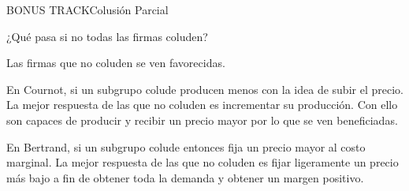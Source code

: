 \documentclass[notes, 11pt]{beamer} %
\newenvironment{wideitemize}{\itemize\addtolength{\itemsep}{10pt}}{\enditemize}
\begin{document}
\begin{frame}{BONUS TRACK}{Colusi\'on Parcial}
\begin{wideitemize}
	\item<1-> ¿Qu\'e pasa si no todas las firmas coluden?
		\begin{wideitemize}
			\item<2->[--] Las firmas que no coluden se ven favorecidas.
			\item<3->[--] En Cournot, si un subgrupo colude producen menos con la idea de subir el precio. La mejor respuesta de las que no coluden es incrementar su producci\'on. Con ello son capaces de producir y recibir un precio mayor por lo que se ven beneficiadas.
			\item<4->[--] En Bertrand, si un subgrupo colude entonces fija un precio mayor al costo marginal. La mejor respuesta de las que no coluden es fijar ligeramente un precio m\'as bajo a fin de obtener toda la demanda y obtener un margen positivo.
		\end{wideitemize}
\end{wideitemize}
\end{frame}
\fi

\begin{frame}
\maketitle
\end{frame}
\end{document}
